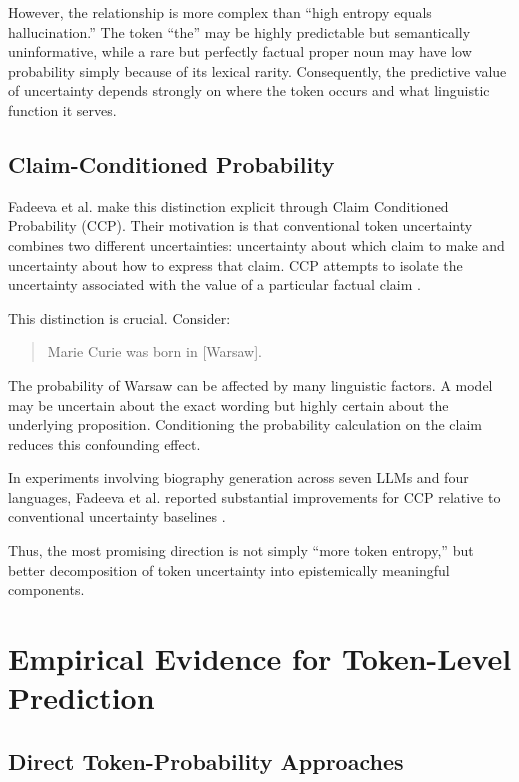 \documentclass[11pt]{article}
\begin{document}
However, the relationship is more complex than ``high entropy equals hallucination.'' The token ``the'' may be highly predictable but semantically uninformative, while a rare but perfectly factual proper noun may have low probability simply because of its lexical rarity. Consequently, the predictive value of uncertainty depends strongly on where the token occurs and what linguistic function it serves.

\subsection{Claim-Conditioned Probability}
\label{sec:claim-conditioned}

Fadeeva et al. make this distinction explicit through Claim Conditioned Probability (CCP). Their motivation is that conventional token uncertainty combines two different uncertainties: uncertainty about which claim to make and uncertainty about how to express that claim. CCP attempts to isolate the uncertainty associated with the value of a particular factual claim \cite{fadeeva2024}.

This distinction is crucial. Consider:

\begin{quote}
Marie Curie was born in [Warsaw].
\end{quote}

The probability of Warsaw can be affected by many linguistic factors. A model may be uncertain about the exact wording but highly certain about the underlying proposition. Conditioning the probability calculation on the claim reduces this confounding effect.

In experiments involving biography generation across seven LLMs and four languages, Fadeeva et al. reported substantial improvements for CCP relative to conventional uncertainty baselines \cite{fadeeva2024}.

Thus, the most promising direction is not simply ``more token entropy,'' but better decomposition of token uncertainty into epistemically meaningful components.

\section{Empirical Evidence for Token-Level Prediction}
\label{sec:empirical-evidence}

\subsection{Direct Token-Probability Approaches}
\label{sec:direct-token}
\end{document}
